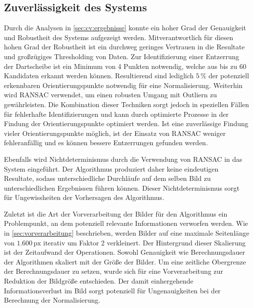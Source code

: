 
\subsection{Zuverlässigkeit des Systems}

Durch die Analysen in \autoref{sec:cv:ergebnisse} konnte ein hoher Grad der Genauigkeit und Robustheit des Systems aufgezeigt werden. Mitverantwortlich für diesen hohen Grad der Robustheit ist ein durchweg geringes Vertrauen in die Resultate und großzügiges Thresholding von Daten. Zur Identifizierung einer Entzerrung der Dartscheibe ist ein Minimum von 4 Punkten notwendig, welche aus bis zu 60 Kandidaten erkannt werden können. Resultierend sind lediglich $5\,\%$ der potenziell erkennbaren Orientierungspunkte notwendig für eine Normalisierung. Weiterhin wird RANSAC verwendet, um einen robusten Umgang mit Outliern zu gewährleisten. Die Kombination dieser Techniken sorgt jedoch in speziellen Fällen für fehlerhafte Identifizierungen und kann durch optimierte Prozesse in der Findung der Orientierungspunkte optimiert werden. Ist eine zuverlässige Findung vieler Orientierungspunkte möglich, ist der Einsatz von RANSAC weniger fehleranfällig und es können bessere Entzerrungen gefunden werden.

Ebenfalls wird Nichtdeterminismus durch die Verwendung von RANSAC in das System eingeführt. Der Algorithmus produziert daher keine eindeutigen Resultate, sodass unterschiedliche Durchläufe auf dem selben Bild zu unterschiedlichen Ergebnissen führen können. Dieser Nichtdeterminismus sorgt für Ungewissheiten der Vorhersagen des Algorithmus.

Zuletzt ist die Art der Vorverarbeitung der Bilder für den Algorithmus ein Problempunkt, an dem potenziell relevante Informationen verworfen werden. Wie in \autoref{sec:vorverarbeitung} beschrieben, werden Bilder auf eine maximale Seitenlänge von $1.600\,\text{px}$ iterativ um Faktor 2 verkleinert. Der Hintergrund dieser Skalierung ist der Zeitaufwand der Operationen. Sowohl Genauigkeit wie Berechnungsdauer der Algorithmen skaliert mit der Größe der Bilder. Um eine zeitliche Obergrenze der Berechnungsdauer zu setzen, wurde sich für eine Vorverarbeitung zur Reduktion der Bildgröße entschieden. Der damit einhergehende Informationsverlust im Bild sorgt potenziell für Ungenauigkeiten bei der Berechnung der Normalisierung.


